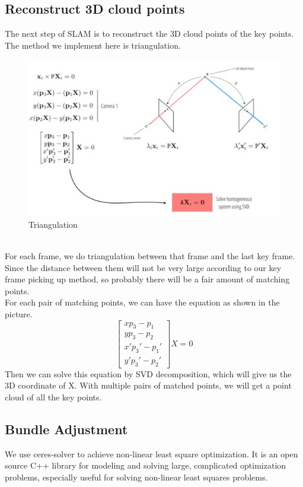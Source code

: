\documentclass[paper=a4, fontsize=14pt]{scrartcl}
\numberwithin{equation}{section}		%
\numberwithin{figure}{section}			%
\numberwithin{table}{section}				%
\begin{document}
\subsection{Reconstruct 3D cloud points}
The next step of SLAM is to reconstruct the 3D cloud points of the key points. The method we implement here is triangulation.\\
\begin{figure}[h]
	\centering
	\includegraphics[width=.80\linewidth]{images/triangulation.jpg}
	\caption{Triangulation}
	\label{fig:framework}
\end{figure}\\
\indent For each frame, we do triangulation between that frame and the last key frame. Since the distance between them will not be very large according to our key frame picking up method, so probably there will be a fair amount of matching points.\\
\indent For each pair of matching points, we can have the equation as shown in the picture.
$$\begin{bmatrix}
xp_3-p_1 \\ yp_3 - p_2 \\ x'p_3' - p_1' \\ y'p_3' - p_2'
\end{bmatrix} X = 0$$
\indent Then we can solve this equation by SVD decomposition, which will give us the 3D coordinate of X. With multiple pairs of matched points, we will get a point cloud of all the key points.

\subsection{Bundle Adjustment}
We use ceres-solver to achieve non-linear least square optimization.
It is an open source C++ library for modeling and solving large, complicated optimization problems, especially useful for solving non-linear least squares problems.
\end{document}

